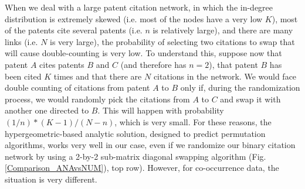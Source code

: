 \documentclass[pre,reprint,groupedaddress,superscriptaddress]{revtex4-1}
\begin{document}
When we deal with a large patent citation network, in which the in-degree distribution is extremely skewed (i.e. most of the nodes have a very low $K$), most of the patents cite several patents (i.e. $n$ is relatively large), and there are many links (i.e. $N$ is very large), the probability of selecting two citations to swap that will cause double-counting is very low. To understand this, suppose now that patent $A$ cites patents $B$ and $C$ (and therefore has $n=2$), that patent $B$ has been cited $K$ times and that there are $N$ citations in the network. We would face double counting of citations from patent $A$ to $B$ only if, during the randomization process, we would randomly pick the citations from $A$ to $C$ and swap it with another one directed to $B$. This will happen with probability $(1/n)*(K-1)/(N-n)$, which is very small. For these reasons, the hypergeometric-based analytic solution, designed to predict permutation algorithms, works very well in our case, even if we randomize our binary citation network by using a 2-by-2 sub-matrix diagonal swapping algorithm (Fig. \ref{Comparison_ANAvsNUM}), top row). However, for co-occurrence data, the situation is very different. 
\end{document}

